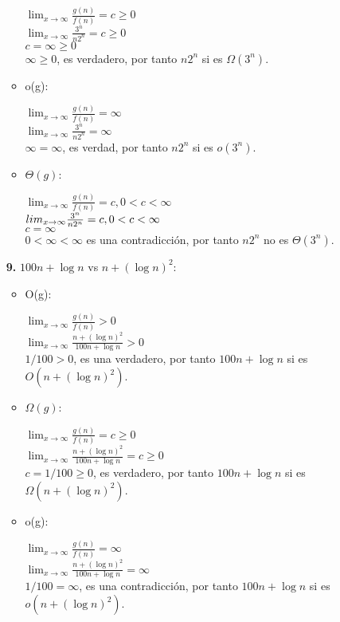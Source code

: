 \documentclass{article}
\begin{document}
\begin{enumerate}[label=\textbf{\alph*.}]
\begin{itemize}
        $\lim_{x\to\infty} \frac{g(n)}{f(n)}=c \geq 0$\\
        $\lim_{x\to\infty} \frac{3^n}{n2^n}=c \geq 0$\\
        $c=\infty \geq 0$\\
        $\infty \geq 0$, es verdadero, por tanto $n2^n$ si es $\Omega(3^n)$.

      \item o(g):
      
        $\lim_{x\to\infty} \frac{g(n)}{f(n)}=\infty$\\
        $\lim_{x\to\infty} \frac{3^n}{n2^n}=\infty$\\
        $\infty=\infty$, es verdad, por tanto $n2^n$ si es $o(3^n)$.

      \item $\Theta(g)$:
      
        $\lim_{x\to\infty} \frac{g(n)}{f(n)}=c,0<c<\infty$\\
        $\\lim_{x\to\infty} \frac{3^n}{n2^n}=c,0<c<\infty$\\
        $c=\infty$\\
	$0<\infty<\infty$ es una contradicción, por tanto $n2^n$ no es $\Theta(3^n)$.
    \end{itemize}

  
  \textbf{9.}  $100n+\log n$ vs $n+(\log n)^2$:
    \begin{itemize}
      \item O(g):
      
        $\lim_{x\to\infty} \frac{g(n)}{f(n)}>0$\\
        $\lim_{x\to\infty} \frac{n+(\log n)^2}{100n+\log n}>0$\\
        $1/100>0$, es una verdadero, por tanto $100n+\log n$ si es $O(n+(\log n)^2)$.

      \item $\Omega(g)$:
      
        $\lim_{x\to\infty} \frac{g(n)}{f(n)}=c \geq 0$\\
        $\lim_{x\to\infty} \frac{n+(\log n)^2}{100n+\log n}=c \geq 0$\\
        $c=1/100 \geq 0$, es verdadero, por tanto $100n+\log n$ si es $\Omega(n+(\log n)^2)$.

      \item o(g):
      
        $\lim_{x\to\infty} \frac{g(n)}{f(n)}=\infty$\\
        $\lim_{x\to\infty} \frac{n+(\log n)^2}{100n+\log n}=\infty$\\
        $1/100=\infty$, es una contradicción, por tanto $100n+\log n$ si es $o(n+(\log n)^2)$.


\end{itemize}
\end{enumerate}
\end{document}
